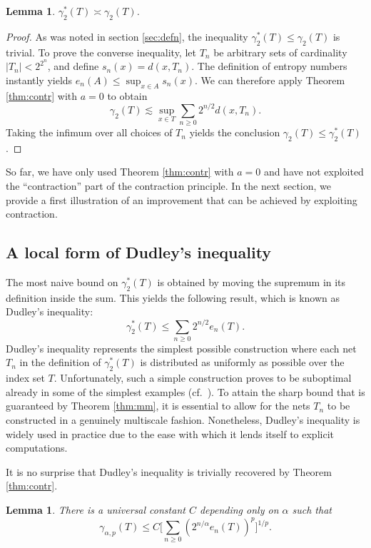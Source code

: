 \documentclass[10pt,reqno]{amsart}
\newtheorem{lem}[thm]{Lemma}
\theoremstyle{definition}
\numberwithin{equation}{section}
\numberwithin{figure}{section}
\numberwithin{table}{section}
\begin{document}
\begin{lem}
$\gamma_2^*(T)\asymp\gamma_2(T)$.
\end{lem}

\begin{proof}
As was noted in section \ref{sec:defn}, the inequality
$\gamma_2^*(T)\le\gamma_2(T)$ is trivial. To prove the converse 
inequality, let $T_n$ be arbitrary sets of cardinality $|T_n|<2^{2^n}$, 
and define $s_n(x)=d(x,T_n)$. The definition of entropy numbers instantly 
yields $e_n(A)\le \sup_{x\in A}s_n(x)$. We can therefore apply Theorem 
\ref{thm:contr} with $a=0$ to obtain
$$
	\gamma_2(T) \lesssim
	\sup_{x\in T}\sum_{n\ge 0}2^{n/2}d(x,T_n).
$$
Taking the infimum over all choices of $T_n$ yields the conclusion
$\gamma_2(T)\le\gamma_2^*(T)$.
\end{proof}

So far, we have only used Theorem \ref{thm:contr} with $a=0$ and have not 
exploited the ``contraction'' part of the contraction principle. In the 
next section, we provide a first illustration of an improvement that can 
be achieved by exploiting contraction.

\subsection{A local form of Dudley's inequality}

The most naive bound on $\gamma_2^*(T)$ is obtained by moving the supremum 
in its definition inside the sum. This yields the following result, which 
is known as Dudley's inequality:
$$
	\gamma_2^*(T) \le
	\sum_{n\ge 0}2^{n/2}e_n(T).
$$
Dudley's inequality represents the simplest possible construction where 
each net $T_n$ in the definition of $\gamma_2^*(T)$ is distributed as 
uniformly as possible over the index set $T$. Unfortunately, such a simple 
construction proves to be suboptimal already in some of the simplest 
examples (cf.\ \cite{Tal14,vH16a}). To attain the sharp bound that is 
guaranteed by Theorem \ref{thm:mm}, it is essential to allow for the nets 
$T_n$ to be constructed in a genuinely multiscale fashion. Nonetheless, 
Dudley's inequality is widely used in practice due to the ease with which 
it lends itself to explicit computations.

It is no surprise that Dudley's inequality is trivially recovered by
Theorem \ref{thm:contr}.

\begin{lem}
\label{lem:dudley}
There is a universal constant $C$ depending only on $\alpha$ such that
$$
	\gamma_{\alpha,p}(T) \le
	C\Bigg[
	\sum_{n\ge 0}(2^{n/\alpha}e_n(T))^p
	\Bigg]^{1/p}.
$$
\end{lem}
\end{document}
